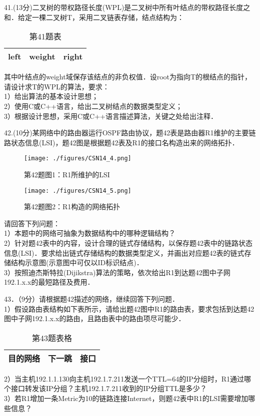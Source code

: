 41.(13分)二叉树的带权路径长度(WPL)是二叉树中所有叶结点的带权路径长度之和．给定一棵二叉树T，采用二叉链表存储，结点结构为：
\begin{table}[ht]
\centering
\caption{第41题表}\label{CSN14_tab1}
\begin{tabular}{|c|c|c|}
\hline
left & weight & right \\
\hline
\end{tabular}
\end{table}
其中叶结点的weight域保存该结点的非负权值．设root为指向T的根结点的指针，请设计求T的WPL的算法，要求： \\
1）给出算法的基本设计思想； \\
2）使用C或C++语言，给出二叉树结点的数据类型定义； \\
3）根据设计思想，采用C或C++语言描述算法，关键之处给出注释．

42.(10分)某网络中的路由器运行OSPF路由协议，题42表是路由器R1维护的主要链路状态信息(LSI)，题42图是根据题42表及R1的接口名构造出来的网络拓扑．
\begin{figure}[ht]
\centering
\texttt{[image: ./figures/CSN14\_4.png]}
\caption{第42题图1：R1所维护的LSI} \label{CSN14_fig4}
\end{figure}

\begin{figure}[ht]
\centering
\texttt{[image: ./figures/CSN14\_5.png]}
\caption{第42题图2：R1构造的网络拓扑} \label{CSN14_fig5}
\end{figure}
请回答下列问题： \\
1）本题中的网络可抽象为数据结构中的哪种逻辑结构？ \\
2）针对题42表中的内容，设计合理的链式存储结构，以保存题42表中的链路状态信息(LSI)．要求给出链式存储结构的数据类型定义，并画出对应题42表的链式存储结构示意图(示意图中可仅以ID标识结点)． \\
3）按照迪杰斯特拉(Dijikstra)算法的策略，依次给出R1到达题42图中子网192.1.x.x的最短路径及费用．

43．（9分）请根据题42描述的网络，继续回答下列问题． \\
1）假设路由表结构如下表所示，请给出题42图中R1的路由表，要求包括到达题42图中子网192.1.x.x的路由，且路由表中的路由项尽可能少． \\
\begin{table}[ht]
\centering
\caption{第43题表格}\label{CSN14_tab2}
\begin{tabular}{|c|c|c|}
\hline
目的网络 & 下一跳 & 接口 \\
\hline
\end{tabular}
\end{table}
2）当主机192.1.1.130向主机192.1.7.211发送一个TTL=64的IP分组时，R1通过哪个接口转发该IP分组？主机192.1.7.211收到的IP分组TTL是多少？ \\
3）若R1增加一条Metric为10的链路连接Internet，则题42表中R1的LSI需要增加哪些信息？


